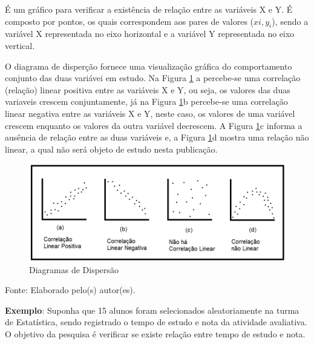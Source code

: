 \documentclass[12pt,portuguese,oneside]{book}
\begin{document}
É um gráfico para verificar a existência de relação entre as variáveis X
e Y. É composto por pontos, os quais correspondem aos pares de valores
(\(xi, y_i\)), sendo a variável X representada no eixo horizontal e a
variável Y representada no eixo vertical.

O diagrama de disperção fornece uma visualização gráfica do
comportamento conjunto das duas variávei em estudo. Na Figura
\ref{fig:diag} a percebe-se uma correlação (relação) linear positiva
entre as variáveis X e Y, ou seja, os valores das duas variaveis crescem
conjuntamente, já na Figura \ref{fig:diag}b percebe-se uma correlação
linear negativa entre as variáveis X e Y, neste caso, os valores de uma
variável crescem enquanto os valores da outra variável decrescem. A
Figura \ref{fig:diag}c informa a ausência de relação entre as duas
variáveis e, a Figura \ref{fig:diag}d mostra uma relação não linear, a
qual não será objeto de estudo nesta publicação.

\begin{figure}[H]

{\centering \includegraphics[width=0.8\linewidth]{correlacao1} 

}

\caption{Diagramas de Dispersão}\label{fig:diag}
\end{figure}

Fonte: Elaborado pelo(s) autor(es).

\textbf{Exemplo}: Suponha que 15 alunos foram selecionados
aleatoriamente na turma de Estatística, sendo registrado o tempo de
estudo e nota da atividade avaliativa. O objetivo da pesquisa é
verificar se existe relação entre tempo de estudo e nota.
\end{document}
